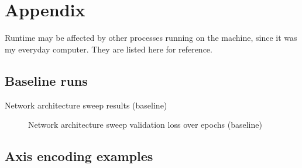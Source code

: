 \appendix

\section{Appendix}

Runtime may be affected by other processes running on the machine, since it was my everyday computer. They are listed here for reference.

\subsection{Baseline runs}
\label{appendix:baseline}

\begin{table}[H]
\caption{Network architecture sweep results (baseline)}
\centering
\begin{adjustbox}{center}

\end{adjustbox}
\end{table}

\begin{figure}[H]
\centering
{}
\caption{Network architecture sweep validation loss over epochs (baseline)}
\end{figure}

\newpage
\subsection{Axis encoding examples}
\label{appendix:axis_samples}

